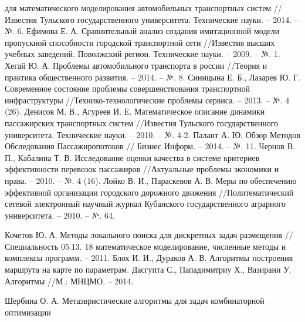 \begin{thebibliography}{10}
        для математического моделирования автомобильных транспортных систем //Известия Тульского 
        государственного университета. Технические науки. -- 2014. -- №. 6.
     Ефимова Е. А. Сравнительный анализ создания имитационной модели пропускной 
        способности городской транспортной сети //Известия высших учебных заведений. Поволжский регион. 
        Технические науки. -- 2009. -- №. 1.
     Хегай Ю. А. Проблемы автомобильного транспорта в россии //Теория и практика 
        общественного развития. -- 2014. -- №. 8.
     Синицына Е. Б., Лазарев Ю. Г. Современное состояние проблемы совершенствования 
        транспортной инфраструктуры //Технико-технологические проблемы сервиса. -- 2013. -- №. 4 (26).
     Денисов М. В., Агуреев И. Е. Математическое описание динамики пассажирских 
        транспортных систем //Известия Тульского государственного университета. 
        Технические науки. -- 2010. -- №. 4-2.
     Палант А. Ю. Обзор Методов Обследования Пассажиропотоков //
        Бизнес Информ. -- 2014. -- №. 11.
     Чернов В. П., Кабалина Т. В. Исследование оценки качества в системе критериев 
        эффективности перевозок пассажиров //Актуальные проблемы экономики и права. -- 2010. -- №. 4 (16).
     Лойко В. И., Параскевов А. В. Меры по обеспечению эффективной организации городского 
        дорожного движения //Политематический сетевой электронный научный журнал Кубанского 
        государственного аграрного университета. -- 2010. -- №. 64.

     Кочетов Ю. А. Методы локального поиска для дискретных задач размещения //
        Специальность 05.13. 18 математическое моделирование, численные методы и 
        комплексы программ. -- 2011.
     Блох И. И., Дураков А. В. Алгоритмы построения маршрута на карте по параметрам.
     Дасгупта С., Пападимитриу Х., Вазирани У. Алгоритмы //М.: МНЦМО. -- 2014.
    
     Шербина О. А. Метаэвристические алгоритмы для задач комбинаторной оптимизации 
    

\end{thebibliography}
